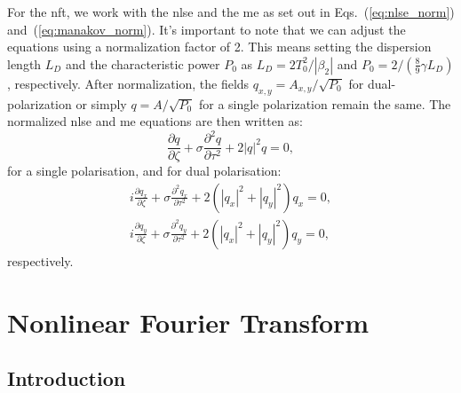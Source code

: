 For the \gls{nft}, we work with the \gls{nlse} and the \gls{me} as set out in Eqs.~(\ref{eq:nlse_norm}) and~(\ref{eq:manakov_norm}). It's important to note that we can adjust the equations using a normalization factor of 2. This means setting the dispersion length \( L_D \) and the characteristic power \( P_0 \) as \( L_D = 2 T_0^2/|\beta_2| \) and \( P_0=2/(\frac{8}{9} \gamma L_D) \), respectively. After normalization, the fields \( q_{x,y}=A_{x,y}/\sqrt{P_0} \) for dual-polarization or simply \( q=A/\sqrt{P_0} \) for a single polarization remain the same. The normalized \acrlong{nlse} and \acrlong{me} equations are then written as:
\begin{equation}
	\frac{\partial q }{\partial \zeta} + \sigma \frac{\partial^2 q}{\partial \tau^2} + 2 |q|^2 q = 0,
\label{eq:nlse_norm2}
\end{equation}
for a single polarisation, and for dual polarisation:
\begin{gather} 
i \frac{\partial q_x}{\partial \zeta} + \sigma\frac{\partial^2 q_x}{\partial \tau^2} + 2 \left(|q_x|^2 + |q_y|^2\right) q_x = 0, \nonumber \\
i \frac{\partial q_y}{\partial \zeta} + \sigma\frac{\partial^2 q_y}{\partial \tau^2} + 2 \left(|q_x|^2 + |q_y|^2\right) q_y = 0,
\label{eq:manakov_norm2}
\end{gather}
respectively.



\section{Nonlinear Fourier Transform}

\subsection{Introduction}

